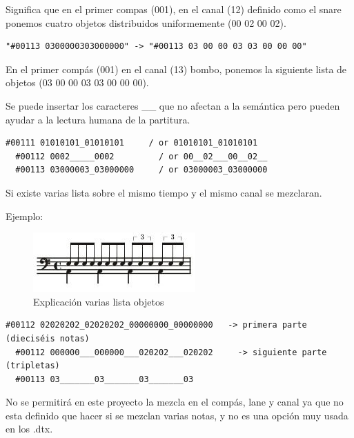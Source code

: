 \documentclass[a4paper,11pt,oneside]{book}
\begin{document}
Significa que en el primer compas (001), en el canal (12) definido como el snare ponemos cuatro objetos distribuidos uniformemente (00 02 00 02).


\begin{Verbatim}[frame=single]
"#00113 0300000303000000" -> "#00113 03 00 00 03 03 00 00 00"
\end{Verbatim}

En el primer compás (001) en el canal (13) bombo, ponemos la siguiente lista de objetos (03 00 00 03 03 00 00 00).

Se puede insertar los caracteres \_\_ que no afectan a la semántica pero pueden ayudar a la lectura humana de la partitura.

\begin{Verbatim}[frame=single]
  #00111 01010101_01010101     / or 01010101_01010101
  #00112 0002_____0002         / or 00__02___00__02__
  #00113 03000003_03000000     / or 03000003_03000000
\end{Verbatim}

Si existe varias lista sobre el mismo tiempo y el mismo canal se mezclaran.

Ejemplo:


\begin{figure}[H]
\begin{center}
\includegraphics[scale=5.0]{Imagenes/particion_varias_listas.jpg}
\caption{Explicación varias lista objetos }
\label{Explicación varias lista objetos}
\end{center}
\end{figure}

\begin{Verbatim}[frame=single]
  #00112 02020202_02020202_00000000_00000000   -> primera parte (dieciséis notas)
  #00112 000000___000000___020202___020202     -> siguiente parte (tripletas)
  #00113 03_______03_______03_______03
\end{Verbatim}

No se permitirá en este proyecto la mezcla en el compás, lane y canal ya que no esta definido que hacer si se mezclan varias notas, y no es una opción muy usada en los .dtx.
\end{document}
